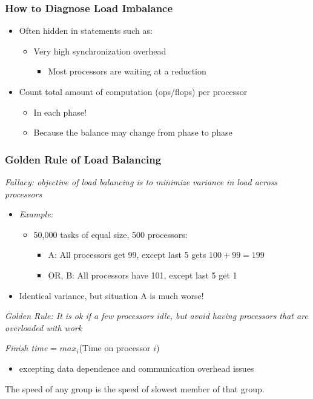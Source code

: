 \begin{frame}[fragile]
\frametitle{How to Diagnose Load Imbalance}
\begin{itemize}
 \item Often hidden in statements such as:
 \begin{itemize}
  \item Very high synchronization overhead
  \begin{itemize}
   \item Most processors are waiting at a reduction
  \end{itemize}
 \end{itemize}
 \item Count total amount of computation (ops/flops) per processor
 \begin{itemize}
  \item In each phase! 
  \item Because the balance may change from phase to phase
 \end{itemize}
\end{itemize}
\end{frame}

\begin{frame}[fragile]
\frametitle{Golden Rule of Load Balancing}
\emph{Fallacy: objective of load balancing is to minimize variance in load across processors}

\begin{itemize}
 \item[]\emph{Example:}
 \begin{itemize}
  \item  50,000 tasks of equal size, 500  processors:
  \begin{itemize}
   \item A: All processors get 99, except last 5 gets $100+99 = 199$
   \item OR, B:  All processors have 101, except last 5 get 1
  \end{itemize}
 \end{itemize}
 \item[] Identical variance, but situation A is much worse!
\end{itemize}


\emph{Golden Rule: It is ok if a few processors idle, but avoid having processors that are overloaded with work}


\emph{Finish time} = $max_i$(Time on processor $i$)
\begin{itemize}
\item[] excepting data dependence and communication overhead issues
\end{itemize}

The speed of any group is the speed of slowest member of that group.
\end{frame}


